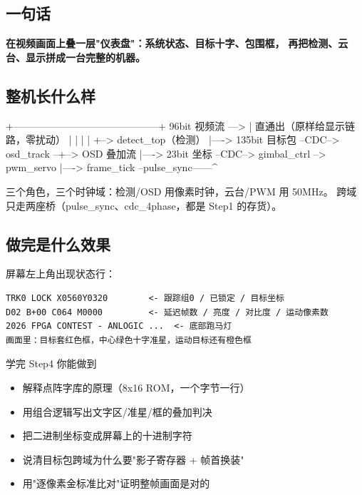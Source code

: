 \documentclass[11pt]{ctexart}
\begin{document}
\subsection{一句话}

\textbf{在视频画面上叠一层"仪表盘"：系统状态、目标十字、包围框，}
\textbf{再把检测、云台、显示拼成一台完整的机器。}

\subsection{整机长什么样}

\begin{Verilog}
                    +--------------------------------------------+
 96bit 视频流 --->  |  直通出（原样给显示链路，零扰动）            |
        |           |                                            |
        +--> detect_top（检测）
                  |----> 135bit 目标包 --CDC--> osd_track --+--> OSD 叠加流
                  |----> 23bit 坐标    --CDC--> gimbal_ctrl --> pwm_servo
                  |----> frame_tick    --pulse_sync------^
\end{Verilog}

三个角色，三个时钟域：检测/OSD 用像素时钟，云台/PWM 用 50MHz。
跨域只走两座桥（pulse\_sync、cdc\_4phase，都是 Step1 的存货）。

\subsection{做完是什么效果}

屏幕左上角出现状态行：

\begin{Verbatim}
TRK0 LOCK X0560Y0320        <- 跟踪组0 / 已锁定 / 目标坐标
D02 B+00 C064 M0000         <- 延迟帧数 / 亮度 / 对比度 / 运动像素数
2026 FPGA CONTEST - ANLOGIC ...  <- 底部跑马灯
画面里：目标套红色框，中心绿色十字准星，运动目标还有橙色框
\end{Verbatim}

\begin{okbox}{学完 Step4 你能做到}
\begin{itemize}
  \item 解释点阵字库的原理（8x16 ROM，一个字节一行）
  \item 用组合逻辑写出文字区/准星/框的叠加判决
  \item 把二进制坐标变成屏幕上的十进制字符
  \item 说清目标包跨域为什么要"影子寄存器 + 帧首换装"
  \item 用"逐像素金标准比对"证明整帧画面是对的
\end{itemize}
\end{okbox}
\end{document}
